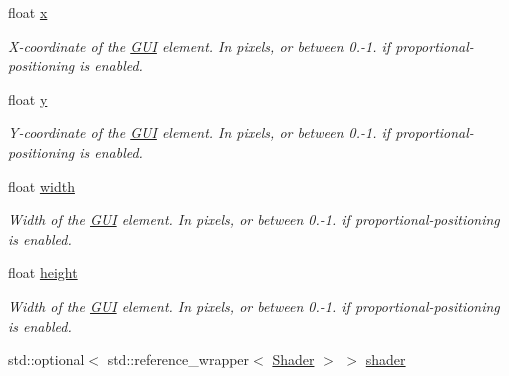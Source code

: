 \begin{DoxyCompactItemize}
\item 
\mbox{\label{class_g_u_i_a7fa193a8ffb27bbb3bcc225e36f6d54d}} 
float \mbox{\hyperlink{class_g_u_i_a7fa193a8ffb27bbb3bcc225e36f6d54d}{x}}
\begin{DoxyCompactList}\small\item\em X-\/coordinate of the \mbox{\hyperlink{class_g_u_i}{G\+UI}} element. In pixels, or between 0.-\/1. if proportional-\/positioning is enabled. \end{DoxyCompactList}\item 
\mbox{\label{class_g_u_i_a98f204f99ffc5ff6cffc9340bbb8c29b}} 
float \mbox{\hyperlink{class_g_u_i_a98f204f99ffc5ff6cffc9340bbb8c29b}{y}}
\begin{DoxyCompactList}\small\item\em Y-\/coordinate of the \mbox{\hyperlink{class_g_u_i}{G\+UI}} element. In pixels, or between 0.-\/1. if proportional-\/positioning is enabled. \end{DoxyCompactList}\item 
\mbox{\label{class_g_u_i_aee5d8766834f6f743f0d8b8c16e47155}} 
float \mbox{\hyperlink{class_g_u_i_aee5d8766834f6f743f0d8b8c16e47155}{width}}
\begin{DoxyCompactList}\small\item\em Width of the \mbox{\hyperlink{class_g_u_i}{G\+UI}} element. In pixels, or between 0.-\/1. if proportional-\/positioning is enabled. \end{DoxyCompactList}\item 
\mbox{\label{class_g_u_i_a70b578c36323a45cac88ccff3bced933}} 
float \mbox{\hyperlink{class_g_u_i_a70b578c36323a45cac88ccff3bced933}{height}}
\begin{DoxyCompactList}\small\item\em Width of the \mbox{\hyperlink{class_g_u_i}{G\+UI}} element. In pixels, or between 0.-\/1. if proportional-\/positioning is enabled. \end{DoxyCompactList}\item 
\mbox{\label{class_g_u_i_a64b007b31d0ec8a8704f9ab3bb2a7d3d}} 
std\+::optional$<$ std\+::reference\+\_\+wrapper$<$ \mbox{\hyperlink{class_shader}{Shader}} $>$ $>$ \mbox{\hyperlink{class_g_u_i_a64b007b31d0ec8a8704f9ab3bb2a7d3d}{shader}}

\end{DoxyCompactItemize}

